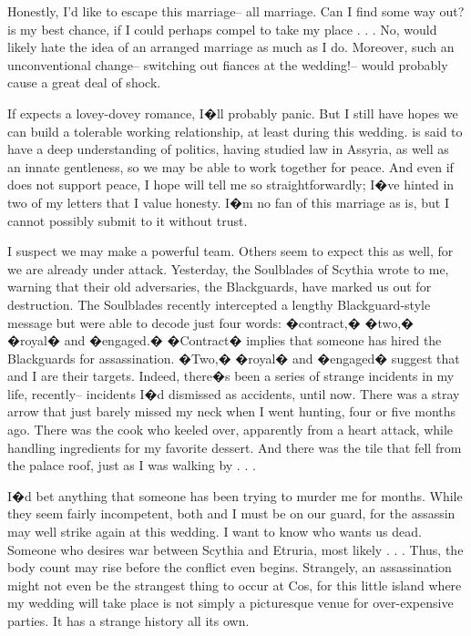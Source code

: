 \documentclass[char]{Kos}
\begin{document}
Honestly, I'd like to escape this marriage-- all marriage. Can I find some way out? \cPoet{\nickname} is my best chance, if I could perhaps compel \cPoet{\nickname} to take my place . . . No, \cPoet{\they} would likely hate the idea of an arranged marriage as much as I do. Moreover, such an unconventional change-- switching out fiances at the wedding!-- would probably cause a great deal of shock.

 If \cBride{\they} expects a lovey-dovey romance, I�ll probably panic. But I still have hopes we can build a tolerable working relationship, at least during this wedding. \cBride{\They} is said to have a deep understanding of politics, having studied law in Assyria, as well as an innate gentleness, so we may be able to work together for peace. And even if \cBride{\they} does not support peace, I hope \cBride{\they} will tell me so straightforwardly; I�ve hinted in two of my letters that I value honesty. I�m no fan of this marriage as is, but I cannot possibly submit to it without trust.

I suspect we may make a powerful team. Others seem to expect this as well, for we are already under attack. Yesterday, the Soulblades of Scythia wrote to me, warning that their old adversaries, the Blackguards, have marked us out for destruction. The Soulblades recently intercepted a lengthy Blackguard-style message but were able to decode just four words: �contract,� �two,� �royal� and �engaged.� �Contract� implies that someone has hired the Blackguards for assassination. �Two,� �royal� and �engaged� suggest that \cBride{\they} and I are their targets. Indeed, there�s been a series of strange incidents in my life, recently-- incidents I�d dismissed as accidents, until now. There was a stray arrow that just barely missed my neck when I went hunting, four or five months ago. There was the cook who keeled over, apparently from a heart attack, while handling ingredients for my favorite dessert. And there was the tile that fell from the palace roof, just as I was walking by . . . 

I�d bet anything that someone has been trying to murder me for months. While they seem fairly incompetent, both \cBride{\nickname} and I must be on our guard, for the assassin may well strike again at this wedding. I want to know who wants us dead. Someone who desires war between Scythia and Etruria, most likely . . . Thus, the body count may rise before the conflict even begins. Strangely, an assassination might not even be the strangest thing to occur at Cos, for this little island where my wedding will take place is not simply a picturesque venue for over-expensive parties. It has a strange history all its own.
\end{document}
